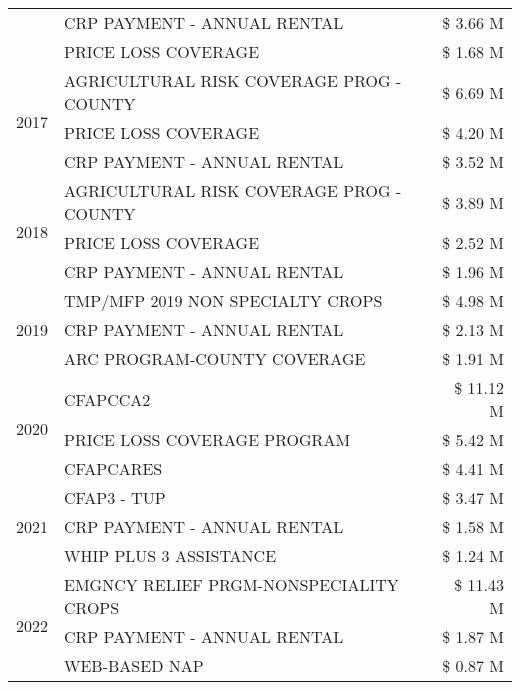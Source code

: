 \begin{tabular}{llr}
 & CRP PAYMENT - ANNUAL RENTAL & \$ 3.66 M \\
 & PRICE LOSS COVERAGE & \$ 1.68 M \\
\cline{1-3}
\multirow[t]{3}{*}{2017} & AGRICULTURAL RISK COVERAGE PROG - COUNTY & \$ 6.69 M \\
 & PRICE LOSS COVERAGE & \$ 4.20 M \\
 & CRP PAYMENT - ANNUAL RENTAL & \$ 3.52 M \\
\cline{1-3}
\multirow[t]{3}{*}{2018} & AGRICULTURAL RISK COVERAGE PROG - COUNTY & \$ 3.89 M \\
 & PRICE LOSS COVERAGE & \$ 2.52 M \\
 & CRP PAYMENT - ANNUAL RENTAL & \$ 1.96 M \\
\cline{1-3}
\multirow[t]{3}{*}{2019} & TMP/MFP 2019 NON SPECIALTY CROPS & \$ 4.98 M \\
 & CRP PAYMENT - ANNUAL RENTAL & \$ 2.13 M \\
 & ARC PROGRAM-COUNTY COVERAGE & \$ 1.91 M \\
\cline{1-3}
\multirow[t]{3}{*}{2020} & CFAPCCA2 & \$ 11.12 M \\
 & PRICE LOSS COVERAGE PROGRAM & \$ 5.42 M \\
 & CFAPCARES & \$ 4.41 M \\
\cline{1-3}
\multirow[t]{3}{*}{2021} & CFAP3 - TUP & \$ 3.47 M \\
 & CRP PAYMENT - ANNUAL RENTAL & \$ 1.58 M \\
 & WHIP PLUS 3 ASSISTANCE & \$ 1.24 M \\
\cline{1-3}
\multirow[t]{3}{*}{2022} & EMGNCY RELIEF PRGM-NONSPECIALITY CROPS & \$ 11.43 M \\
 & CRP PAYMENT - ANNUAL RENTAL & \$ 1.87 M \\
 & WEB-BASED NAP & \$ 0.87 M \\
\cline{1-3}
\bottomrule
\end{tabular}
